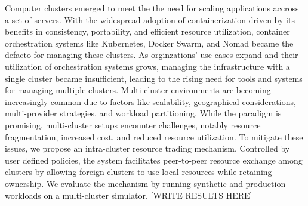 Computer clusters emerged to meet the the need for scaling applications accross
a set of servers. With the widespread adoption of containerization driven by
its benefits in consistency, portability, and efficient resource utilization,
container orchestration systems like Kubernetes, Docker Swarm, and Nomad became
the defacto for managing these clusters. As orginzations' use cases expand and
their utilization of orchestration systems grows, managing the infrastructure
with a single cluster became insufficient, leading to the rising need for tools
and systems for managing multiple clusters. Multi-cluster environments are
becoming increasingly common due to factors like scalability, geographical
considerations, multi-provider strategies, and workload partitioning. While the
paradigm is promising, multi-cluster setups encounter challenges, notably
resource fragmentation, increased cost, and reduced resource utilization. To
mitigate these issues, we propose an intra-cluster resource trading mechanism.
Controlled by user defined policies, the system facilitates peer-to-peer
resource exchange among clusters by allowing foreign clusters to use local
resources while retaining ownership. We evaluate the mechanism by running
synthetic and production workloads on a multi-cluster simulator. [WRITE RESULTS
HERE]
